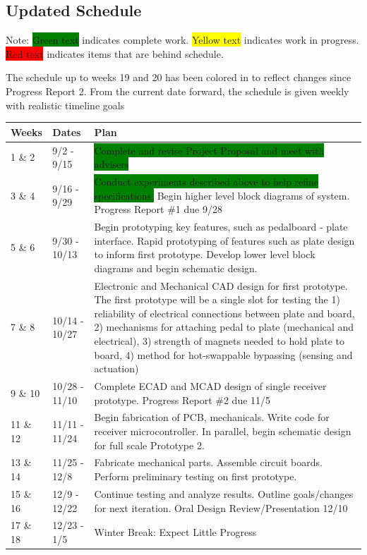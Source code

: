 \documentclass{article}
\begin{document}
	\subsection{Updated Schedule}

	Note: \colorbox{green}{Green text} indicates complete work.  \colorbox{yellow}{Yellow text} indicates work in progress.  \colorbox{red}{Red text} indicates items that are behind schedule.

	The schedule up to weeks 19 and 20 has been colored in to reflect changes since Progress Report 2.  From the current date forward, the schedule is given weekly with realistic timeline goals

	\begin{table}[H]
	\begin{tabular}{llp{4in}}
	Weeks    & Dates         & Plan \\
	\hline
	1 \& 2   & 9/2 - 9/15    &  \colorbox{green}{Complete and revise Project Proposal and meet with advisers}      \\
	3 \& 4   & 9/16 - 9/29   &  \colorbox{green}{Conduct experiments described above to help refine specifications.}  \color{green}Begin higher level block diagrams of system.  Progress Report \#1 due 9/28     \\
	5 \& 6   & 9/30 - 10/13  &  \color{green}Begin prototyping key features, such as pedalboard - plate interface. Rapid prototyping of features such as plate design to inform first prototype. Develop lower level block diagrams and begin schematic design.     \\
	7 \& 8   & 10/14 - 10/27 &  \color{green}Electronic and Mechanical CAD design for first prototype.  The first prototype will be a single slot for testing the 1) reliability of electrical connections between plate and board, 2) mechanisms for attaching pedal to plate (mechanical and electrical), 3) strength of magnets needed to hold plate to board, 4) method for hot-swappable bypassing (sensing and actuation)     \\
	9 \& 10  & 10/28 - 11/10 & \color{green}Complete ECAD and MCAD design of single receiver prototype.  Progress Report \#2 due 11/5    \\
	11 \& 12 & 11/11 - 11/24 &  \color{green}Begin fabrication of PCB, mechanicals.  Write code for receiver microcontroller.  In parallel, begin schematic design for full scale Prototype 2.  \\
	13 \& 14 & 11/25 - 12/8  & \color{green}Fabricate mechanical parts.  Assemble circuit boards.  Perform preliminary testing on first prototype.      \\
	15 \& 16 & 12/9 - 12/22  &  \color{green}Continue testing and analyze results.  Outline goals/changes for next iteration.  Oral Design Review/Presentation 12/10    \\
	17 \& 18 & 12/23 - 1/5   &  \color{green}Winter Break: Expect Little Progress    \\
	\end{tabular}
	\end{table}
\end{document}
